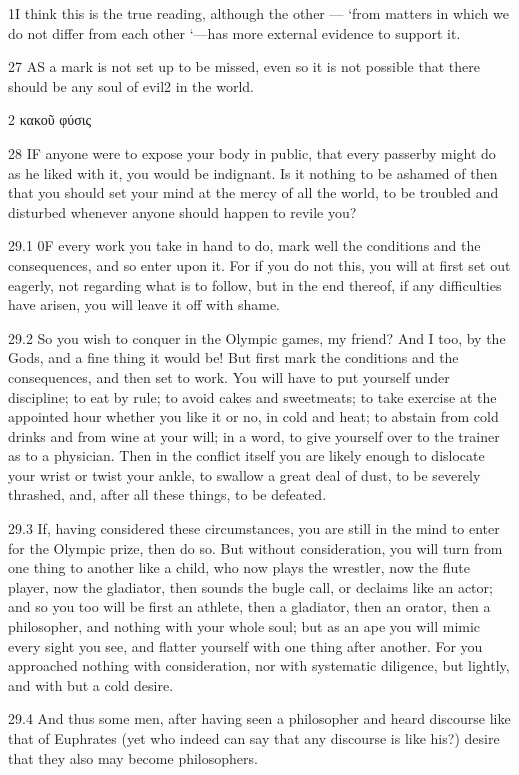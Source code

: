    1I think this is the true reading, although the other — ‘from matters in which we do not differ from each other ‘—has more external evidence to support it.

   27   AS a mark is not set up to be missed, even so it is not possible that there should be any soul of evil2 in the world.

   2 κακοῦ φύσις

   28   IF anyone were to expose your body in public, that every passerby might do as he liked with it, you would be indignant. Is it nothing to be ashamed of then that you should set your mind at the mercy of all the world, to be troubled and disturbed whenever anyone should happen to revile you?

   29.1   0F every work you take in hand to do, mark well the conditions and the consequences, and so enter upon it. For if you do not this, you will at first set out eagerly, not regarding what is to follow, but in the end thereof, if any difficulties have arisen, you will leave it off with shame.

   29.2   So you wish to conquer in the Olympic games, my friend? And I too, by the Gods, and a fine thing it would be! But first mark the conditions and the consequences, and then set to work. You will have to put yourself under discipline; to eat by rule; to avoid cakes and sweetmeats; to take exercise at the appointed hour whether you like it or no, in cold and heat; to abstain from cold drinks and from wine at your will; in a word, to give yourself over to the trainer as to a physician. Then in the conflict itself you are likely enough to dislocate your wrist or twist your ankle, to swallow a great deal of dust, to be severely thrashed, and, after all these things, to be defeated.

   29.3   If, having considered these circumstances, you are still in the mind to enter for the Olympic prize, then do so. But without consideration, you will turn from one thing to another like a child, who now plays the wrestler, now the flute player, now the gladiator, then sounds the bugle call, or declaims like an actor; and so you too will be first an athlete, then a gladiator, then an orator, then a philosopher, and nothing with your whole soul; but as an ape you will mimic every sight you see, and flatter yourself with one thing after another. For you approached nothing with consideration, nor with systematic diligence, but lightly, and with but a cold desire.

   29.4   And thus some men, after having seen a philosopher and heard discourse like that of Euphrates (yet who indeed can say that any discourse is like his?) desire that they also may become philosophers.

